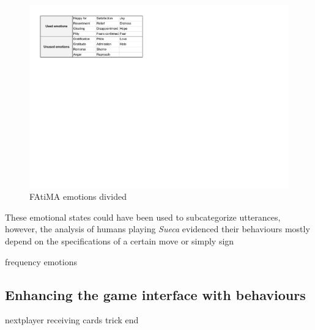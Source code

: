 \begin{figure}[ht]
	\centering
    \includegraphics[width=1\textwidth]{./img/emotions}
	\caption{FAtiMA emotions divided}
\label{fig:emotions}
\end{figure}

These emotional states could have been used to subcategorize utterances, however, the analysis of humans playing \emph{Sueca} evidenced their behaviours mostly depend on the specifications of a certain move or simply sign 

frequency
emotions

\subsection{Enhancing the game interface with behaviours}
nextplayer
receiving cards
trick end